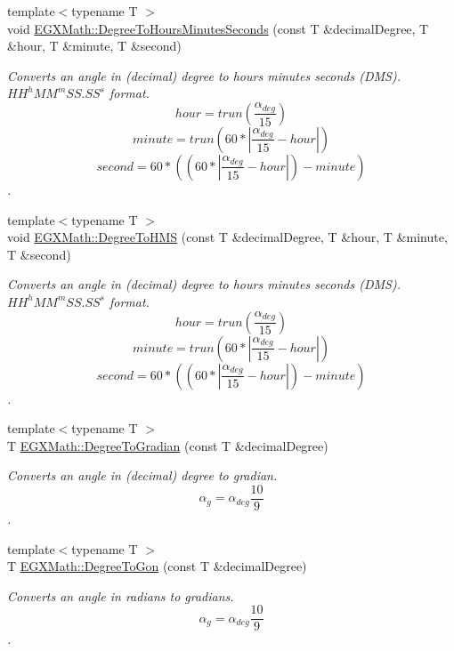 \begin{DoxyCompactItemize}
{\footnotesize template$<$typename T $>$ }\\void \mbox{\hyperlink{group___e_g_x_math-_angle_conversions-_degree_ga770b13da33b6f6c7bfa398cca7f24dbe}{E\+G\+X\+Math\+::\+Degree\+To\+Hours\+Minutes\+Seconds}} (const T \&decimal\+Degree, T \&hour, T \&minute, T \&second)
\begin{DoxyCompactList}\small\item\em Converts an angle in (decimal) degree to hours minutes seconds (D\+MS). ${HH}^{h}{MM}^{m}{SS.SS}^{s}$ format. \[hour=trun(\frac{\alpha_{deg}}{15})\] \[minute=trun(60 * |\frac{\alpha_{deg}}{15} - hour|)\] \[second=60 * ((60 * |\frac{\alpha_{deg}}{15} - hour|)-minute)\]. \end{DoxyCompactList}\item 
{\footnotesize template$<$typename T $>$ }\\void \mbox{\hyperlink{group___e_g_x_math-_angle_conversions-_degree_ga0bb223ca6e77b00439a6d910ab32d82e}{E\+G\+X\+Math\+::\+Degree\+To\+H\+MS}} (const T \&decimal\+Degree, T \&hour, T \&minute, T \&second)
\begin{DoxyCompactList}\small\item\em Converts an angle in (decimal) degree to hours minutes seconds (D\+MS). ${HH}^{h}{MM}^{m}{SS.SS}^{s}$ format. \[hour=trun(\frac{\alpha_{deg}}{15})\] \[minute=trun(60 * |\frac{\alpha_{deg}}{15} - hour|)\] \[second=60 * ((60 * |\frac{\alpha_{deg}}{15} - hour|)-minute)\]. \end{DoxyCompactList}\item 
{\footnotesize template$<$typename T $>$ }\\T \mbox{\hyperlink{group___e_g_x_math-_angle_conversions-_degree_ga25bb5506b3f66fff7a1b85bf7bd795b3}{E\+G\+X\+Math\+::\+Degree\+To\+Gradian}} (const T \&decimal\+Degree)
\begin{DoxyCompactList}\small\item\em Converts an angle in (decimal) degree to gradian. \[\alpha_{g}=\alpha_{deg}\frac{10}{9}\]. \end{DoxyCompactList}\item 
{\footnotesize template$<$typename T $>$ }\\T \mbox{\hyperlink{group___e_g_x_math-_angle_conversions-_degree_ga87c3fab0867021e5d2501197b4db6194}{E\+G\+X\+Math\+::\+Degree\+To\+Gon}} (const T \&decimal\+Degree)
\begin{DoxyCompactList}\small\item\em Converts an angle in radians to gradians. \[\alpha_{g}=\alpha_{deg}\frac{10}{9}\]. \end{DoxyCompactList}\item 

\end{DoxyCompactItemize}
